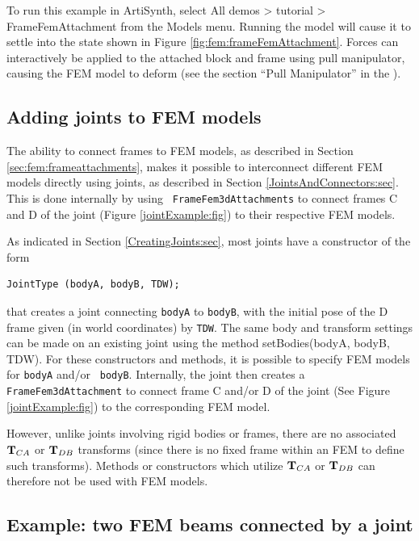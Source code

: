 To run this example in ArtiSynth, select {\sf All demos > tutorial >
FrameFemAttachment} from the {\sf Models} menu. Running the model will
cause it to settle into the state shown in Figure
\ref{fig:fem:frameFemAttachment}. Forces can interactively
be applied to the attached block and frame using
pull manipulator, causing the FEM model to deform 
(see the section ``Pull Manipulator'' in the
).

\subsection{Adding joints to FEM models}

The ability to connect frames to FEM models, as described in Section
\ref{sec:fem:frameattachments}, makes it possible to interconnect
different FEM models directly using joints, as described in Section
\ref{JointsAndConnectors:sec}. This is done internally by using {\tt
FrameFem3dAttachments} to connect frames C and D of the joint (Figure
\ref{jointExample:fig}) to their respective FEM models.

As indicated in Section \ref{CreatingJoints:sec}, most
joints have a constructor of the form
%
\begin{lstlisting}[]
  JointType (bodyA, bodyB, TDW);
\end{lstlisting}
%
that creates a joint connecting {\tt bodyA} to {\tt bodyB}, with the
initial pose of the D frame given (in world coordinates) by {\tt TDW}.
The same body and transform settings can be made on an existing joint
using the method %
{setBodies(bodyA, bodyB, TDW)}.  For these constructors and methods,
it is possible to specify FEM models for {\tt bodyA} and/or {\tt
bodyB}. Internally, the joint then creates a {\tt
FrameFem3dAttachment} to connect frame C and/or D of the joint (See
Figure \ref{jointExample:fig}) to the corresponding FEM model.

However, unlike joints involving rigid bodies or frames, there are no
associated ${\bf T}_{CA}$ or ${\bf T}_{DB}$ transforms (since there is no fixed
frame within an FEM to define such transforms).  Methods or
constructors which utilize ${\bf T}_{CA}$ or ${\bf T}_{DB}$ can therefore
not be used with FEM models.

\subsection{Example: two FEM beams connected by a joint}

